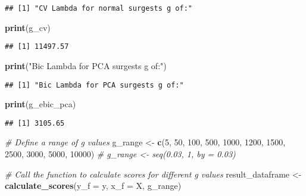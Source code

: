 \documentclass[
]{article}
\newenvironment{Shaded}{\begin{snugshade}}{\end{snugshade}}
\newcommand{\AttributeTok}[1]{\textcolor[rgb]{0.13,0.29,0.53}{#1}}
\newcommand{\CommentTok}[1]{\textcolor[rgb]{0.56,0.35,0.01}{\textit{#1}}}
\newcommand{\DecValTok}[1]{\textcolor[rgb]{0.00,0.00,0.81}{#1}}
\newcommand{\FunctionTok}[1]{\textcolor[rgb]{0.13,0.29,0.53}{\textbf{#1}}}
\newcommand{\NormalTok}[1]{#1}
\newcommand{\OtherTok}[1]{\textcolor[rgb]{0.56,0.35,0.01}{#1}}
\newcommand{\StringTok}[1]{\textcolor[rgb]{0.31,0.60,0.02}{#1}}
\begin{document}
\begin{verbatim}
## [1] "CV Lambda for normal surgests g of:"
\end{verbatim}

\begin{Shaded}
\begin{Highlighting}[]
\FunctionTok{print}\NormalTok{(g\_cv)}
\end{Highlighting}
\end{Shaded}

\begin{verbatim}
## [1] 11497.57
\end{verbatim}

\begin{Shaded}
\begin{Highlighting}[]
\FunctionTok{print}\NormalTok{(}\StringTok{"Bic Lambda for PCA surgests g of:"}\NormalTok{)}
\end{Highlighting}
\end{Shaded}

\begin{verbatim}
## [1] "Bic Lambda for PCA surgests g of:"
\end{verbatim}

\begin{Shaded}
\begin{Highlighting}[]
\FunctionTok{print}\NormalTok{(g\_ebic\_pca)}
\end{Highlighting}
\end{Shaded}

\begin{verbatim}
## [1] 3105.65
\end{verbatim}

\begin{Shaded}
\begin{Highlighting}[]
\CommentTok{\# Define a range of \textquotesingle{}g\textquotesingle{} values}
\NormalTok{g\_range }\OtherTok{\textless{}{-}} \FunctionTok{c}\NormalTok{(}\DecValTok{5}\NormalTok{, }\DecValTok{50}\NormalTok{, }\DecValTok{100}\NormalTok{, }\DecValTok{500}\NormalTok{, }\DecValTok{1000}\NormalTok{, }\DecValTok{1200}\NormalTok{, }\DecValTok{1500}\NormalTok{, }\DecValTok{2500}\NormalTok{, }\DecValTok{3000}\NormalTok{, }\DecValTok{5000}\NormalTok{, }\DecValTok{10000}\NormalTok{)}
\CommentTok{\# g\_range \textless{}{-} seq(0.03, 1, by = 0.03)}

\CommentTok{\# Call the function to calculate scores for different \textquotesingle{}g\textquotesingle{} values}
\NormalTok{result\_dataframe }\OtherTok{\textless{}{-}} \FunctionTok{calculate\_scores}\NormalTok{(}\AttributeTok{y\_f =}\NormalTok{ y, }\AttributeTok{x\_f =}\NormalTok{ X, g\_range)}
\end{Highlighting}
\end{Shaded}
\end{document}
